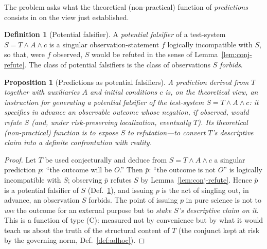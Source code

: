 \documentclass{amsart}
\theoremstyle{definition}
\newtheorem{definition}{Definition}
\theoremstyle{plain}
\newtheorem{proposition}{Proposition}
\begin{document}
The problem asks what the theoretical (non-practical) function of
\emph{predictions} consists in on the view just established.

\begin{definition}[Potential falsifier]\label{def:falsifier}
A \emph{potential falsifier} of a test-system $S=T\wedge A\wedge c$ is a
singular observation-statement $f$ logically incompatible with $S$, so that,
were $f$ observed, $S$ would be refuted in the sense of
Lemma~\ref{lem:conj-refute}. The class of potential falsifiers is the class of
observations $S$ \emph{forbids}.
\end{definition}

\begin{proposition}[Predictions as potential
falsifiers]\label{prop:pred-falsifier}
A prediction derived from $T$ together with auxiliaries $A$ and initial
conditions $c$ is, on the theoretical view, an instruction for generating a
potential falsifier of the test-system $S=T\wedge A\wedge c$: it specifies in
advance an observable outcome whose negation, if observed, would refute $S$
(and, under risk-preserving localization, eventually $T$). Its theoretical
(non-practical) function is to \emph{expose $S$ to refutation}---to convert
$T$'s descriptive claim into a definite confrontation with reality.
\end{proposition}

\begin{proof}
Let $T$ be used conjecturally and deduce from $S=T\wedge A\wedge c$ a singular
prediction $p$: ``the outcome will be $O$.'' Then $\bar p$: ``the outcome is not
$O$'' is logically incompatible with $S$; observing $\bar p$ refutes $S$ by
Lemma~\ref{lem:conj-refute}. Hence $\bar p$ is a potential falsifier of $S$
(Def.~\ref{def:falsifier}), and issuing $p$ is the act of singling out, in
advance, an observation $S$ forbids. The point of issuing $p$ in pure science is
not to \emph{use} the outcome for an external purpose but to \emph{stake $S$'s
descriptive claim on it}. This is a function of type (C): measured not by
convenience but by what it would teach us about the truth of the structural
content of $T$ (the conjunct kept at risk by the governing norm,
Def.~\ref{def:adhoc}).
\end{proof}
\end{document}
